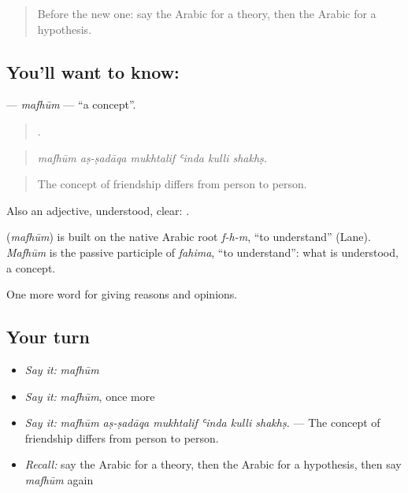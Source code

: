 \label{lesson:AR-C363-mafhum}



\begin{quote}
Before the new one: say the Arabic for a theory, then the Arabic for a hypothesis.
\end{quote}

\subsection*{You'll want to know: }
\textbf{} — \emph{mafhūm} — \textquotedblleft{}a concept\textquotedblright{}.

\begin{quote}
     .
\end{quote}

\begin{quote}
\emph{mafhūm aṣ-ṣadāqa mukhtalif ʿinda kulli shakhṣ.}
\end{quote}

\begin{quote}
The concept of friendship differs from person to person.
\end{quote}

Also an adjective, understood, clear:  .

\begin{cousinweb}
\textbf{} (\emph{mafhūm}) is built on the native Arabic root \emph{f-h-m}, \textquotedblleft{}to understand\textquotedblright{} (Lane). \emph{Mafhūm} is the passive participle of \emph{fahima}, \textquotedblleft{}to understand\textquotedblright{}: what is understood, a concept.
\end{cousinweb}

\begin{grammarlens}[title={What you've built}]
One more word for giving reasons and opinions.
\end{grammarlens}

\subsection*{Your turn}
\begin{itemize}
\raggedright
  \item \emph{Say it:} \emph{mafhūm}
  \item \emph{Say it:} \emph{mafhūm}, once more
  \item \emph{Say it:} \emph{mafhūm aṣ-ṣadāqa mukhtalif ʿinda kulli shakhṣ.} — The concept of friendship differs from person to person.
  \item \emph{Recall:} say the Arabic for a theory, then the Arabic for a hypothesis, then say \emph{mafhūm} again
\end{itemize}

